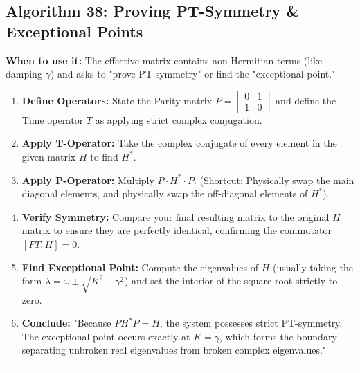 \documentclass[11pt, a4paper]{report}
\begin{document}
\subsection*{Algorithm 38: Proving PT-Symmetry \& Exceptional Points}
\textbf{When to use it:} The effective matrix contains non-Hermitian terms (like damping $\gamma$) and asks to "prove PT symmetry" or find the "exceptional point."
\begin{enumerate}[label=\textbf{\arabic*.}]
    \item \textbf{Define Operators:} State the Parity matrix $P = [\begin{smallmatrix} 0 & 1 \\ 1 & 0 \end{smallmatrix}]$ and define the Time operator $T$ as applying strict complex conjugation.
    \item \textbf{Apply T-Operator:} Take the complex conjugate of every element in the given matrix $H$ to find $H^*$.
    \item \textbf{Apply P-Operator:} Multiply $P \cdot H^* \cdot P$. (Shortcut: Physically swap the main diagonal elements, and physically swap the off-diagonal elements of $H^*$).
    \item \textbf{Verify Symmetry:} Compare your final resulting matrix to the original $H$ matrix to ensure they are perfectly identical, confirming the commutator $[PT, H] = 0$.
    \item \textbf{Find Exceptional Point:} Compute the eigenvalues of $H$ (usually taking the form $\lambda = \omega \pm \sqrt{K^2 - \gamma^2}$) and set the interior of the square root strictly to zero.
    \item \textbf{Conclude:} "Because $PH^*P = H$, the system possesses strict PT-symmetry. The exceptional point occurs exactly at $K = \gamma$, which forms the boundary separating unbroken real eigenvalues from broken complex eigenvalues."
\end{enumerate}
\vspace{1em}
\noindent\rule{\textwidth}{0.4pt}
\vspace{1em}
\end{document}
